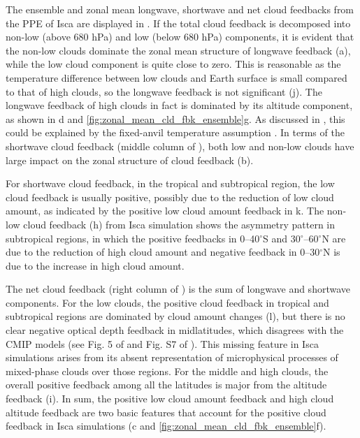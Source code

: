 The ensemble and zonal mean longwave, shortwave and net cloud feedbacks from the PPE of Isca are displayed in . If the total cloud feedback is decomposed into non-low (above 680 hPa) and low (below 680 hPa) components, it is evident that the non-low clouds dominate the zonal mean structure of longwave feedback (a), while the low cloud component is quite close to zero. This is reasonable as the temperature difference between low clouds and Earth surface is small compared to that of high clouds, so the longwave feedback is not significant (j). The longwave feedback of high clouds in fact is dominated by its altitude component, as shown in d and \ref{fig:zonal_mean_cld_fbk_ensemble}g. As discussed in , this could be explained by the fixed-anvil temperature assumption \citep{Hartmann2002FAT}. In terms of the shortwave cloud feedback (middle column of ), both low and non-low clouds have large impact on the zonal structure of cloud feedback (b). 

For shortwave cloud feedback, in the tropical and subtropical region, the low cloud feedback is usually positive, possibly due to the reduction of low cloud amount, as indicated by the positive low cloud amount feedback in k. The non-low cloud feedback (h) from Isca simulation shows the asymmetry pattern in subtropical regions, in which the positive feedbacks in 0--40$^\circ$S and 30$^\circ$--60$^\circ$N are due to the reduction of high cloud amount  and negative feedback in 0--30$^\circ$N is due to the increase in high cloud amount. 

The net cloud feedback (right column of ) is the sum of longwave and shortwave components. For the low clouds, the positive cloud feedback in tropical and subtropical regions are dominated by cloud amount changes (l), but there is no clear negative optical depth feedback in midlatitudes, which disagrees with the CMIP models (see Fig. 5 of \citealt{Sherwood2020} and Fig. S7 of \citealt{Zelinka2016insights}). This missing feature in Isca simulations arises from its absent representation of microphysical processes of mixed-phase clouds over those regions. For the middle and high clouds, the overall positive feedback among all the latitudes is major from the altitude feedback (i). In sum, the positive low cloud amount feedback and high cloud altitude feedback are two basic features that account for the positive cloud feedback in Isca simulations (c and \ref{fig:zonal_mean_cld_fbk_ensemble}f).

